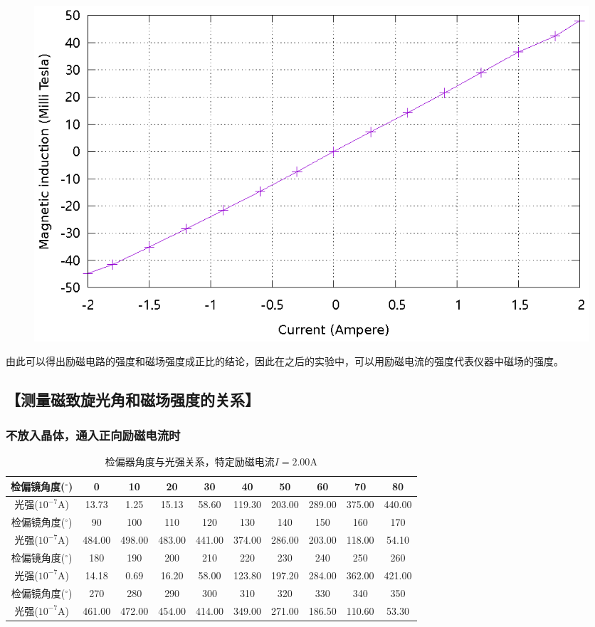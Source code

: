 \documentclass{ctexart}
\newcommand{\si}[1]{\mathrm{#1}}
\let\oldsubsection\subsection
\renewcommand{\subsection}[1]{\oldsubsection{\!\!\!\!\!\!【#1】}}
\let\oldsubsubsection\subsubsection
\renewcommand{\subsubsection}[1]{\oldsubsubsection{\!\!\!\!\!\!#1}}
\begin{document}
\begin{figure}[H]
    \centering
    \includegraphics[width=\linewidth]{optics-figures/current-mfield.gnuplot}
\end{figure}

由此可以得出励磁电路的强度和磁场强度成正比的结论，因此在之后的实验中，可以用励磁电流的强度代表仪器中磁场的强度。

\newpage
\subsection{测量磁致旋光角和磁场强度的关系}

\subsubsection{不放入晶体，通入正向励磁电流时}

\begin{table}[H]
  \centering
  \begin{tabular}{|c|c|c|c|c|c|c|c|c|c|}
    \hline
    检偏镜角度(${}^{\circ}$)  & 0   & 10  & 20  & 30  & 40  & 50  & 60  & 70  & 80  \\\hline
    光强($10^{-7} \si{A}$) & 13.73 & 1.25 & 15.13 & 58.60 & 119.30 & 203.00 & 289.00 & 375.00 & 440.00 \\\hline
    检偏镜角度(${}^{\circ}$)  & 90  & 100 & 110 & 120 & 130 & 140 & 150 & 160 & 170 \\\hline
    光强($10^{-7} \si{A}$) & 484.00 & 498.00 & 483.00 & 441.00 & 374.00 & 286.00 & 203.00 & 118.00 & 54.10 \\\hline
    检偏镜角度(${}^{\circ}$)  & 180 & 190 & 200 & 210 & 220 & 230 & 240 & 250 & 260 \\\hline
    光强($10^{-7} \si{A}$) & 14.18 & 0.69 & 16.20 & 58.00 & 123.80 & 197.20 & 284.00 & 362.00 & 421.00 \\\hline
    检偏镜角度(${}^{\circ}$)  & 270 & 280 & 290 & 300 & 310 & 320 & 330 & 340 & 350 \\\hline
    光强($10^{-7} \si{A}$) & 461.00 & 472.00 & 454.00 & 414.00 & 349.00 & 271.00 & 186.50 & 110.60 & 53.30 \\\hline
  \end{tabular}
  \caption{检偏器角度与光强关系，特定励磁电流$I=2.00 \si{A}$}
\end{table}
\end{document}
